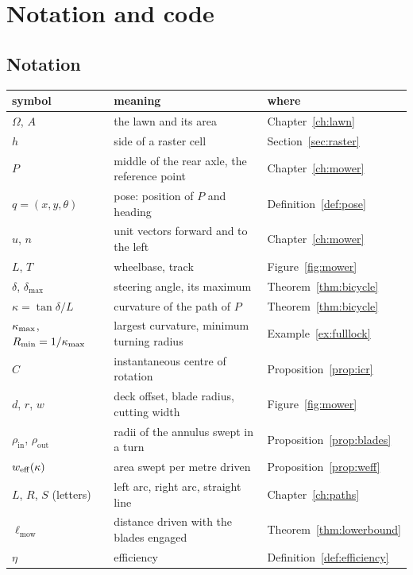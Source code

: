 \chapter{Notation and code}
\label{ch:appendix}

\section{Notation}

\begin{center}
\begin{tabular}{@{}lll@{}}
  \toprule
  symbol & meaning & where \\
  \midrule
  $\Omega$, $A$ & the lawn and its area & Chapter~\ref{ch:lawn} \\
  $h$ & side of a raster cell & Section~\ref{sec:raster} \\
  $P$ & middle of the rear axle, the reference point & Chapter~\ref{ch:mower}
    \\
  $q = (x, y, \theta)$ & pose: position of $P$ and heading &
    Definition~\ref{def:pose} \\
  $u$, $n$ & unit vectors forward and to the left & Chapter~\ref{ch:mower} \\
  $L$, $T$ & wheelbase, track & Figure~\ref{fig:mower} \\
  $\delta$, $\delta_{\max}$ & steering angle, its maximum &
    Theorem~\ref{thm:bicycle} \\
  $\kappa = \tan\delta / L$ & curvature of the path of $P$ &
    Theorem~\ref{thm:bicycle} \\
  $\kappa_{\max}$, $R_{\min} = 1/\kappa_{\max}$ & largest curvature, minimum turning radius &
    Example~\ref{ex:fulllock} \\
  $C$ & instantaneous centre of rotation & Proposition~\ref{prop:icr} \\
  $d$, $r$, $w$ & deck offset, blade radius, cutting width &
    Figure~\ref{fig:mower} \\
  $\rho_{\mathrm{in}}$, $\rho_{\mathrm{out}}$ & radii of the annulus swept in
    a turn & Proposition~\ref{prop:blades} \\
  $w_{\mathrm{eff}}(\kappa)$ & area swept per metre driven & Proposition~\ref{prop:weff}
    \\
  $L$, $R$, $S$ (letters) & left arc, right arc, straight line &
    Chapter~\ref{ch:paths} \\
  $\ell_{\mathrm{mow}}$ & distance driven with the blades engaged &
    Theorem~\ref{thm:lowerbound} \\
  $\eta$ & efficiency & Definition~\ref{def:efficiency} \\

\end{tabular}
\end{center}
